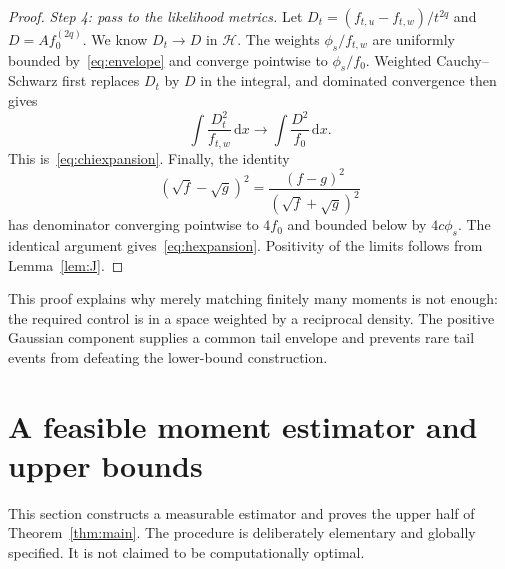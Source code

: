 \documentclass[11pt,a4paper]{article}
\numberwithin{equation}{section}
\theoremstyle{definition}
\theoremstyle{remark}
\newcommand{\dd}{\,\mathrm d}
\begin{document}
\begin{proof}
\emph{Step 4: pass to the likelihood metrics.}
Let $D_t=(f_{t,u}-f_{t,w})/t^{2q}$ and $D=A f_0^{(2q)}$. We know
$D_t\to D$ in $\mathcal H$. The weights $\phi_s/f_{t,w}$ are uniformly bounded
by~\eqref{eq:envelope} and converge pointwise to $\phi_s/f_0$. Weighted
Cauchy--Schwarz first replaces $D_t$ by $D$ in the integral, and dominated
convergence then gives
\[
 \int\frac{D_t^2}{f_{t,w}}\dd x\longrightarrow\int\frac{D^2}{f_0}\dd x.
\]
This is~\eqref{eq:chiexpansion}. Finally, the identity
\[
 (\sqrt f-\sqrt g)^2=\frac{(f-g)^2}{(\sqrt f+\sqrt g)^2}
\]
has denominator converging pointwise to $4f_0$ and bounded below by
$4c\phi_s$. The identical argument gives~\eqref{eq:hexpansion}. Positivity
of the limits follows from Lemma~\ref{lem:J}.
\end{proof}

This proof explains why merely matching finitely many moments is not enough:
the required control is in a space weighted by a reciprocal density. The
positive Gaussian component supplies a common tail envelope and prevents
rare tail events from defeating the lower-bound construction.

\section{A feasible moment estimator and upper bounds}
\label{sec:upper}

This section constructs a measurable estimator and proves the upper half of
Theorem~\ref{thm:main}. The procedure is deliberately elementary and globally
specified. It is not claimed to be computationally optimal.
\end{document}
